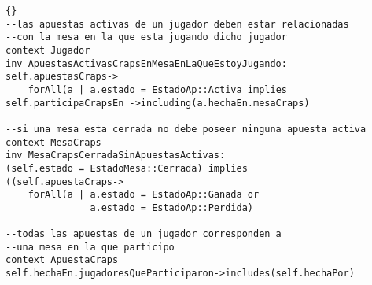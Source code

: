 \begin{framed}
\begin{lstlisting}[frame=trbl]{}
--las apuestas activas de un jugador deben estar relacionadas 
--con la mesa en la que esta jugando dicho jugador
context Jugador
inv ApuestasActivasCrapsEnMesaEnLaQueEstoyJugando:
self.apuestasCraps->
    forAll(a | a.estado = EstadoAp::Activa implies 
self.participaCrapsEn ->including(a.hechaEn.mesaCraps)

--si una mesa esta cerrada no debe poseer ninguna apuesta activa
context MesaCraps
inv MesaCrapsCerradaSinApuestasActivas:
(self.estado = EstadoMesa::Cerrada) implies 
((self.apuestaCraps->
    forAll(a | a.estado = EstadoAp::Ganada or 
               a.estado = EstadoAp::Perdida)

--todas las apuestas de un jugador corresponden a 
--una mesa en la que participo
context ApuestaCraps
self.hechaEn.jugadoresQueParticiparon->includes(self.hechaPor)

\end{lstlisting}
\end{framed}

